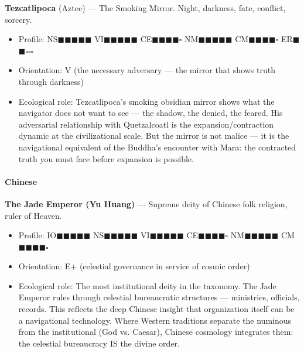 \textbf{Tezcatlipoca} (Aztec) — The Smoking Mirror. Night, darkness, fate, conflict, sorcery.

\begin{itemize}[nosep,leftmargin=*]
  \item Profile: NS$\blacksquare$$\blacksquare$$\blacksquare$$\blacksquare$$\blacksquare$ VI$\blacksquare$$\blacksquare$$\blacksquare$$\blacksquare$$\blacksquare$ CE$\blacksquare$$\blacksquare$$\blacksquare$$\blacksquare$$\square$ NM$\blacksquare$$\blacksquare$$\blacksquare$$\blacksquare$$\blacksquare$ CM$\blacksquare$$\blacksquare$$\blacksquare$$\blacksquare$$\square$ ER$\blacksquare$$\blacksquare$$\square$$\square$$\square$
  \item Orientation: V (the necessary adversary — the mirror that shows truth through darkness)
  \item Ecological role: Tezcatlipoca's smoking obsidian mirror shows what the navigator does not want to see — the shadow, the denied, the feared. His adversarial relationship with Quetzalcoatl is the expansion/contraction dynamic at the civilizational scale. But the mirror is not malice — it is the navigational equivalent of the Buddha's encounter with Mara: the contracted truth you must face before expansion is possible.
\end{itemize}


\paragraph*{Chinese}


\textbf{The Jade Emperor (Yu Huang)} — Supreme deity of Chinese folk religion, ruler of Heaven.

\begin{itemize}[nosep,leftmargin=*]
  \item Profile: IO$\blacksquare$$\blacksquare$$\blacksquare$$\blacksquare$$\blacksquare$ NS$\blacksquare$$\blacksquare$$\blacksquare$$\blacksquare$$\blacksquare$ VI$\blacksquare$$\blacksquare$$\blacksquare$$\blacksquare$$\blacksquare$ CE$\blacksquare$$\blacksquare$$\blacksquare$$\blacksquare$$\square$ NM$\blacksquare$$\blacksquare$$\blacksquare$$\blacksquare$$\blacksquare$ CM$\blacksquare$$\blacksquare$$\blacksquare$$\blacksquare$$\square$
  \item Orientation: E+ (celestial governance in service of cosmic order)
  \item Ecological role: The most institutional deity in the taxonomy. The Jade Emperor rules through celestial bureaucratic structures — ministries, officials, records. This reflects the deep Chinese insight that organization itself can be a navigational technology. Where Western traditions separate the numinous from the institutional (God vs. Caesar), Chinese cosmology integrates them: the celestial bureaucracy IS the divine order.
\end{itemize}


